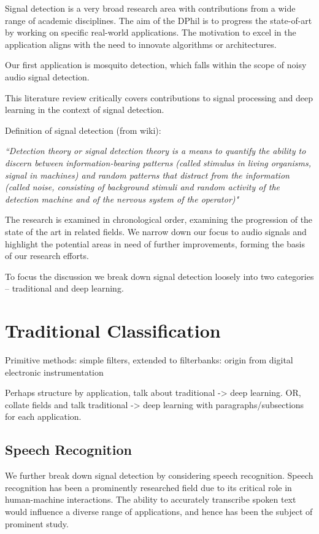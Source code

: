 \documentclass[12pt]{llncs}
\begin{document}
Signal detection is a very broad research area with contributions from a wide range of academic disciplines. The aim of the DPhil is to progress the state-of-art by working on specific real-world applications.  The motivation to excel in the application aligns with the need to innovate algorithms or architectures. 

Our first application is mosquito detection, which falls within the scope of noisy audio signal detection.

This literature review critically covers contributions to signal processing and deep learning in the context of signal detection.


Definition of signal detection (from wiki):

\emph{``Detection theory or signal detection theory is a means to quantify the ability to discern between information-bearing patterns (called stimulus in living organisms, signal in machines) and random patterns that distract from the information (called noise, consisting of background stimuli and random activity of the detection machine and of the nervous system of the operator)"}

 The research is examined in chronological order, examining the progression of the state of the art in related fields. We narrow down our focus to audio signals and highlight the potential areas in need of further improvements, forming the basis of our research efforts.

To focus the discussion we break down signal detection loosely into two categories -- traditional and deep learning.


\section{Traditional Classification}

Primitive methods: simple filters, extended to filterbanks: origin from digital electronic instrumentation



Perhaps structure by application, talk about traditional -> deep learning. OR, collate fields and talk traditional -> deep learning with paragraphs/subsections for each application.
\subsection{Speech Recognition}
We further break down signal detection by considering speech recognition. Speech recognition has been a prominently researched field due to its critical role in human-machine interactions. The ability to accurately transcribe spoken text would influence a diverse range of applications, and hence has been the subject of prominent study. 
\end{document}
